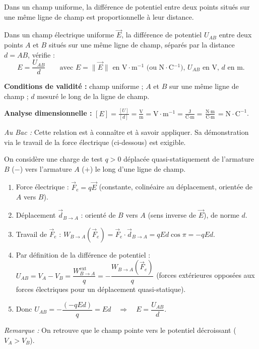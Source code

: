 \documentclass[11pt]{article}
\newcounter{popsec}
\newcounter{popsub}
\newcommand{\courssub}[1]{%
  \stepcounter{popsub}%
  \par\vspace{9pt}\noindent{\popxbold\fontsize{11.5}{13}\selectfont\color{popink}{\color{poporange}\thepopsec.\thepopsub}\hspace{6pt}#1}\par\nopagebreak\vspace{4pt}
}
\begin{document}
\courssub{Relation fondamentale : $E = \dfrac{U}{d}$}

Dans un champ uniforme, la différence de potentiel entre deux points situés sur une même ligne de champ est proportionnelle à leur distance.

\begin{propriete}[Relation $E = U/d$ dans un champ uniforme]
Dans un champ électrique uniforme $\vec{E}$, la différence de potentiel $U_{AB}$ entre deux points $A$ et $B$ situés sur une même ligne de champ, séparés par la distance $d = AB$, vérifie :
\[
E = \frac{U_{AB}}{d} \qquad \text{avec } E = \|\vec{E}\| \text{ en V$\cdot$m$^{-1}$ (ou N$\cdot$C$^{-1}$), } U_{AB} \text{ en V, } d \text{ en m.}
\]
\par \textbf{Conditions de validité :} champ uniforme ; $A$ et $B$ sur une même ligne de champ ; $d$ mesuré le long de la ligne de champ.
\par \textbf{Analyse dimensionnelle :} $[E] = \frac{[U]}{[d]} = \frac{\text{V}}{\text{m}} = \text{V}\cdot\text{m}^{-1} = \frac{\text{J}}{\text{C}\cdot\text{m}} = \frac{\text{N}\cdot\text{m}}{\text{C}\cdot\text{m}} = \text{N}\cdot\text{C}^{-1}$.
\par \emph{Au Bac :} Cette relation est à connaître et à savoir appliquer. Sa démonstration via le travail de la force électrique (ci-dessous) est exigible.
\end{propriete}

\begin{experience}[Démonstration guidée de $E = U/d$ (via le travail de la force électrique)]
On considère une charge de test $q > 0$ déplacée quasi-statiquement de l'armature $B$ ($-$) vers l'armature $A$ ($+$) le long d'une ligne de champ.
\begin{enumerate}
    \item Force électrique : $\vec{F}_e = q\vec{E}$ (constante, colinéaire au déplacement, orientée de $A$ vers $B$).
    \item Déplacement $\vec{d}_{B\to A}$ : orienté de $B$ vers $A$ (sens inverse de $\vec{E}$), de norme $d$.
    \item Travail de $\vec{F}_e$ : $W_{B\to A}(\vec{F}_e) = \vec{F}_e \cdot \vec{d}_{B\to A} = q E d \cos\pi = -q E d$.
    \item Par définition de la différence de potentiel : $U_{AB} = V_A - V_B = \dfrac{W_{B\to A}^{\text{ext}}}{q} = -\dfrac{W_{B\to A}(\vec{F}_e)}{q}$ (forces extérieures opposées aux forces électriques pour un déplacement quasi-statique).
    \item Donc $U_{AB} = -\dfrac{(-q E d)}{q} = E d \quad\Rightarrow\quad \boxed{E = \dfrac{U_{AB}}{d}}$.
\end{enumerate}
\emph{Remarque :} On retrouve que le champ pointe vers le potentiel décroissant ($V_A > V_B$).
\end{experience}
\end{document}
